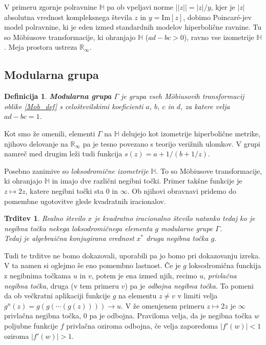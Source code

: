 \documentclass[a4paper,12pt]{article}
\def\R{\mathbb{R}} %
\def\H{\mathbb{H}} %
\newtheorem{trditev}{Trditev}
\newtheorem{definicija}{Definicija}
\begin{document}
V primeru zgornje polravnine $\H$ pa ob vpeljavi norme $||z|| = |z| / y$, kjer je $|z|$ absolutna vrednost kompleksnega števila $z$ in $y = \text{Im}[z]$, dobimo Poincar\'{e}-jev model polravnine, ki je eden izmed standardnih modelov hiperbolične ravnine. Tu so M\"{o}biusove transformacije, ki ohranjajo $\H$ ($ad - bc > 0$), ravno vse izometrije $\H$. Meja prostora ustreza $\R_{\infty}.$ 


\subsection{Modularna grupa}

\begin{definicija}
    \textbf{Modularna grupa} $\Gamma$ je grupa vseh M\"{o}biusovih transformacij oblike \eqref{Mob_def} s celoštevilskimi koeficienti $a$, $b$, $c$ in $d$, za katere velja $ad - bc = 1$.
\end{definicija}

Kot smo že omenili, elementi $\Gamma$ na $\H$ delujejo kot izometrije hiperbolične metrike, njihovo delovanje na $\R_{\infty}$ pa je tesno povezano s teorijo verižnih ulomkov. V grupi namreč med drugim leži tudi funkcija $s(z) = a + 1/(b + 1/z)$.

Posebno zanimive so \emph{loksodromične izometrije} $\H$. To so M\"{o}biusove transformacije, ki ohranjajo $\H$ in imajo dve različni negibni točki. Primer takšne funkcije je $z \mapsto 2z$, katere negibni točki sta $0$ in $\infty$. Ob njihovi obravnavi pridemo do pomembne ugotovitve glede kvadratnih iracionalov.
\begin{trditev}
    \label{Lokso}
    Realno število $x$ je kvadratno iracionalno število natanko tedaj ko je negibna točka nekega loksodromičnega elementa $g$ modularne grupe $\Gamma$.\\
    Tedaj je algebraična konjugirana vrednost $x^*$ druga negibna točka $g$.
\end{trditev}

Tudi te trditve ne bomo dokazovali,  uporabili pa jo bomo pri dokazovanju izreka. V ta namen si oglejmo še eno pomembno lastnost. Če je $g$ loksodromična funckija z negibnima točkama $u$ in $v$, potem je ena izmed njih, recimo $u$, \emph{privlačna negibna točka}, druga (v tem primeru $v$) pa je \emph{odbojna negibna točka}. To pomeni da ob večkratni aplikaciji funkcije $g$ na elementu $z \neq v$ v limiti velja $g^n(z) = g(g(\cdots(g(z)))) \to u$. V že omenjenem primeru $z \mapsto 2z$ je $\infty$ privlačna negibna točka, $0$ pa je odbojna. Praviloma velja, da je negibna točka $w$ poljubne funkcije $f$ privlačna oziroma odbojna, če velja zaporedoma $|f'(w)| < 1$ oziroma $|f'(w)| > 1$.
\newpage
\end{document}
